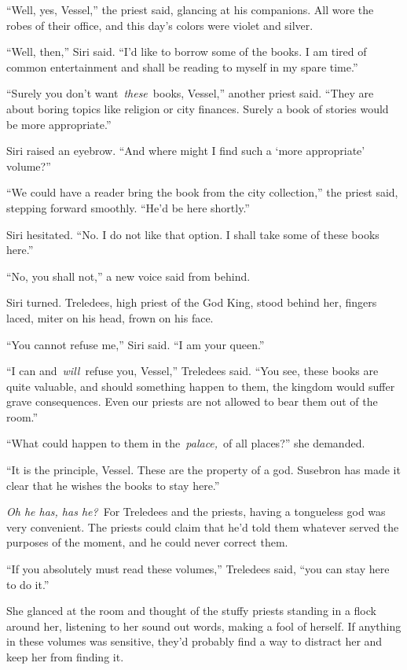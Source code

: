 “Well, yes, Vessel,” the priest said, glancing at his companions. All wore the robes of their office, and this day’s colors were violet and silver.

“Well, then,” Siri said. “I’d like to borrow some of the books. I am tired of common entertainment and shall be reading to myself in my spare time.”

“Surely you don’t want~\textit{these}~books, Vessel,” another priest said. “They are about boring topics like religion or city finances. Surely a book of stories would be more appropriate.”

Siri raised an eyebrow. “And where might I find such a ‘more appropriate’ volume?”

“We could have a reader bring the book from the city collection,” the priest said, stepping forward smoothly. “He’d be here shortly.”

Siri hesitated. “No. I do not like that option. I shall take some of these books here.”

“No, you shall not,” a new voice said from behind.

Siri turned. Treledees, high priest of the God King, stood behind her, fingers laced, miter on his head, frown on his face.

“You cannot refuse me,” Siri said. “I am your queen.”

“I can and~\textit{will}~refuse you, Vessel,” Treledees said. “You see, these books are quite valuable, and should something happen to them, the kingdom would suffer grave consequences. Even our priests are not allowed to bear them out of the room.”

“What could happen to them in the~\textit{palace,}~of all places?” she demanded.

“It is the principle, Vessel. These are the property of a god. Susebron has made it clear that he wishes the books to stay here.”

\textit{Oh he has, has he?}~For Treledees and the priests, having a tongueless god was very convenient. The priests could claim that he’d told them whatever served the purposes of the moment, and he could never correct them.

“If you absolutely must read these volumes,” Treledees said, “you can stay here to do it.”

She glanced at the room and thought of the stuffy priests standing in a flock around her, listening to her sound out words, making a fool of herself. If anything in these volumes was sensitive, they’d probably find a way to distract her and keep her from finding it.

